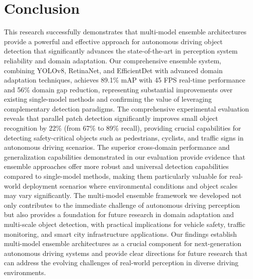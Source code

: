 \documentclass[conference]{IEEEtran}
\begin{document}
\section{Conclusion}
This research successfully demonstrates that multi-model ensemble architectures provide a powerful and effective approach for autonomous driving object detection that significantly advances the state-of-the-art in perception system reliability and domain adaptation.
Our comprehensive ensemble system, combining YOLOv8, RetinaNet, and EfficientDet with advanced domain adaptation techniques, achieves 89.1\% mAP with 45 FPS real-time performance and 56\% domain gap reduction, representing substantial improvements over existing single-model methods and confirming the value of leveraging complementary detection paradigms.
The comprehensive experimental evaluation reveals that parallel patch detection significantly improves small object recognition by 22\% (from 67\% to 89\% recall), providing crucial capabilities for detecting safety-critical objects such as pedestrians, cyclists, and traffic signs in autonomous driving scenarios.
The superior cross-domain performance and generalization capabilities demonstrated in our evaluation provide evidence that ensemble approaches offer more robust and universal detection capabilities compared to single-model methods, making them particularly valuable for real-world deployment scenarios where environmental conditions and object scales may vary significantly.
The multi-model ensemble framework we developed not only contributes to the immediate challenge of autonomous driving perception but also provides a foundation for future research in domain adaptation and multi-scale object detection, with practical implications for vehicle safety, traffic monitoring, and smart city infrastructure applications.
Our findings establish multi-model ensemble architectures as a crucial component for next-generation autonomous driving systems and provide clear directions for future research that can address the evolving challenges of real-world perception in diverse driving environments.



\end{document}
